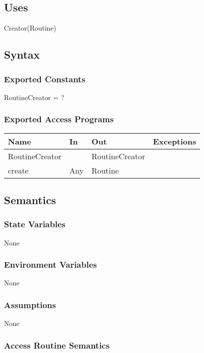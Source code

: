 \documentclass[12pt, titlepage]{article}
\begin{document}
\subsection{Uses}

Creator(Routine)

\subsection{Syntax}

\subsubsection{Exported Constants}

RoutineCreator = ?

\subsubsection{Exported Access Programs}

\begin{center}
	\begin{tabular}{p{2cm} p{4cm} p{4cm} p{2cm}}
		\hline
		\textbf{Name} & \textbf{In} & \textbf{Out} & \textbf{Exceptions} \\
		\hline
		RoutineCreator &  & RoutineCreator &  \\
		create & Any & Routine &  \\
		\hline
	\end{tabular}
\end{center}

\subsection{Semantics}

\subsubsection{State Variables}
None
\subsubsection{Environment Variables}
None
\subsubsection{Assumptions}
None
\subsubsection{Access Routine Semantics}
\end{document}
